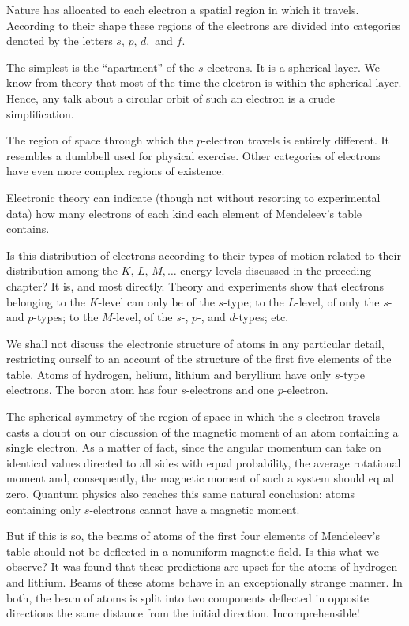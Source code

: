 Nature has allocated to each electron a spatial region in which it travels. According to their shape these regions of the electrons are divided into categories denoted by the letters $s,\, p, \,d,$ and $f$.

The simplest is the ``apartment'' of the $s$-electrons. It is a spherical layer. We know from theory that most of the time the electron is within the spherical layer. Hence, any talk about a circular orbit of such an electron is a crude simplification.

The region of space through which the $p$-electron travels is entirely different. It resembles a dumbbell used for physical exercise. Other categories of electrons have even more complex regions of existence.\label{cloud-shape}

Electronic theory can indicate (though not without resorting to experimental data) how many electrons of each kind each element of Mendeleev's table contains.

Is this distribution of electrons according to their types of motion related to their distribution among the $K,\, L,\, M, \ldots$ energy levels discussed in the preceding chapter? It is, and most directly. Theory and experiments show that electrons belonging to the $K$-level can only be of the $s$-type; to the $L$-level, of only the $s$- and $p$-types; to the $M$-level, of the $s$-, $p$-, and $d$-types; etc.

We shall not discuss the electronic structure of atoms in any particular detail, restricting ourself to an account of the structure of the first five elements of the table. Atoms of hydrogen, helium, lithium and beryllium have only $s$-type electrons. The boron atom has four $s$-electrons and one $p$-electron.


The spherical symmetry of the region of space in which the $s$-electron travels casts a doubt on our discussion of the magnetic moment of an atom containing a single electron. As a matter of fact, since the angular momentum can take on identical values directed to all sides with equal probability, the average rotational moment and, consequently, the magnetic moment of such a system should equal zero. Quantum physics also reaches this same natural conclusion: atoms containing only $s$-electrons cannot have a magnetic moment.

But if this is so, the beams of atoms of the first four elements of Mendeleev's table should not be deflected in a nonuniform magnetic field. Is this what we observe? It was found that these predictions are upset for the atoms of hydrogen and lithium. Beams of these atoms behave in an exceptionally strange manner. In both, the beam of atoms is split into two components deflected in opposite directions the same distance from the initial direction. Incomprehensible!

